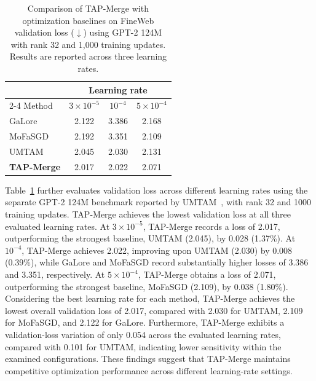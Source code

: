 \documentclass[fleqn,10pt]{wlscirep}
\begin{document}
\begin{table}[t]
\centering\small
\caption{Comparison of TAP-Merge with optimization baselines
on FineWeb validation loss ($\downarrow$) using GPT-2 124M
with rank 32 and 1,000 training updates. Results are reported
across three learning rates.}
\label{tab:fineweb_lr}
\begin{tabular}{lccc}
\toprule
 & \multicolumn{3}{c}{Learning rate}\\
\cmidrule(lr){2-4}
Method & $3\times10^{-5}$ & $10^{-4}$ & $5\times10^{-4}$\\
\midrule
GaLore~\cite{galore2024} & 2.122 & 3.386 & 2.168\\
MoFaSGD~\cite{mofasgd2025} & 2.192 & 3.351 & 2.109\\
UMTAM~\cite{umtam2026} & 2.045 & 2.030 & 2.131\\
\midrule
\textbf{TAP-Merge} & 2.017 & 2.022 & 2.071\\ \bottomrule
\end{tabular}
\end{table}


Table~\ref{tab:fineweb_lr} further evaluates validation loss across different learning rates using the separate GPT-2 124M benchmark reported by UMTAM~\cite{umtam2026}, with rank 32 and 1000 training updates. TAP-Merge achieves the lowest validation loss at all three evaluated learning rates. At $3\times10^{-5}$, TAP-Merge records a loss of 2.017, outperforming the strongest baseline, UMTAM (2.045), by 0.028 (1.37\%). At $10^{-4}$, TAP-Merge achieves 2.022, improving upon UMTAM (2.030) by 0.008 (0.39\%), while GaLore and MoFaSGD record substantially higher losses of 3.386 and 3.351, respectively. At $5\times10^{-4}$, TAP-Merge obtains a loss of 2.071, outperforming the strongest baseline, MoFaSGD (2.109), by 0.038 (1.80\%). Considering the best learning rate for each method, TAP-Merge achieves the lowest overall validation loss of 2.017, compared with 2.030 for UMTAM, 2.109 for MoFaSGD, and 2.122 for GaLore. Furthermore, TAP-Merge exhibits a validation-loss variation of only 0.054 across the evaluated learning rates, compared with 0.101 for UMTAM, indicating lower sensitivity within the examined configurations. These findings suggest that TAP-Merge maintains competitive optimization performance across different learning-rate settings.
\end{document}
